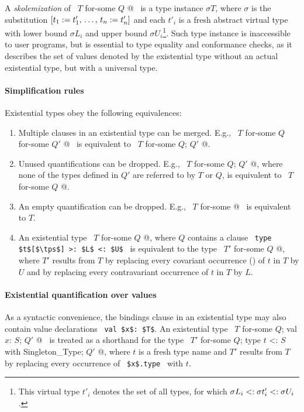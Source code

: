 A {\em skolemization} of ~\lstinline@$T$ for-some { $Q$ }@~ is a type instance $\sigma T$, where $\sigma$ is the substitution $[t_1 := t'_1 ,\, \ldots ,\, t_n := t'_n]$ and each $t'_i$ is a fresh abstract virtual type with lower bound $\sigma L_i$ and upper bound $\sigma U_i$\footnote{This virtual type $t'_i$ denotes the set of all types, for which $\sigma L_i <: \sigma t'_i <: \sigma U_i$.}. Such type instance is inaccessible to user programs, but is essential to type equality and conformance checks, as it describes the set of values denoted by the existential type without an actual existential type, but with a universal type. 



\paragraph{Simplification rules}
Existential types obey the following equivalences:
\begin{enumerate}
\item
Multiple  clauses in an existential type can be merged. E.g., ~\lstinline@$T$ for-some { $Q$ } for-some { $Q'$ }@~ is equivalent to ~\lstinline@$T$ for-some { $Q$; $Q'$ }@. 

\item
Unused quantifications can be dropped. E.g., ~\lstinline@$T$ for-some { $Q$; $Q'$ }@, where none of the types defined in $Q'$ are referred to by $T$ or $Q$, is equivalent to ~\lstinline@$T$ for-some { $Q$ }@. 

\item
An empty quantification can be dropped. E.g., ~\lstinline@$T$ for-some { }@~ is equivalent to $T$. 

\item
An existential type ~\lstinline@$T$ for-some { $Q$ }@, where $Q$ contains a clause ~\lstinline!type $t$[$\tps$] >: $L$ <: $U$!~ is equivalent to the type ~\lstinline@$T'$ for-some { $Q$ }@, where $T'$ results from $T$ by replacing every covariant occurrence () of $t$ in $T$ by $U$ and by replacing every contravariant occurrence of $t$ in $T$ by $L$. 
\end{enumerate}



\paragraph{Existential quantification over values}
As a syntactic convenience, the bindings clause in an existential type may also contain value declarations ~\lstinline!val $x$: $T$!. An existential type ~\lstinline@$T$ for-some { $Q$; val $x$: $S$; $Q'$ }@~ is treated as a shorthand for the type ~\lstinline@$T'$ for-some { $Q$; type $t$ <: $S$ with Singleton_Type; $Q'$ }@, where $t$ is a fresh type name and $T'$ results from $T$ by replacing every occurrence of ~\lstinline!$x$.type!~ with $t$. 



